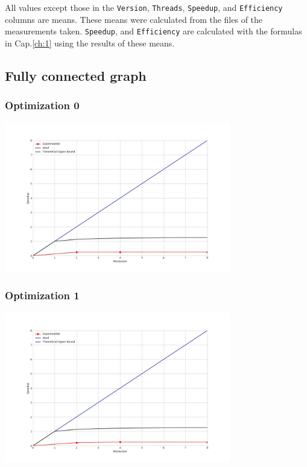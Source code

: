 All values except those in the \verb|Version|, \verb|Threads|, \verb|Speedup|, and \verb|Efficiency| columns are means. These means were calculated from the files of the measurements taken.
\verb|Speedup|, and \verb|Efficiency| are calculated with the formulas in Cap.\ref{ch:1} using the results of these means.

\clearpage
\subsection{Fully connected graph}
\subsubsection{Optimization 0}
\begin{center}
    \resizebox{0.8\textwidth}{!}{}
    \includegraphics[width=0.74\textwidth]{../img/speedup-graph_type-fully-connected-12500-O0}
\end{center}

\subsubsection{Optimization 1}
\begin{center}
    \resizebox{0.8\textwidth}{!}{}
    \includegraphics[width=0.74\textwidth]{../img/speedup-graph_type-fully-connected-12500-O1}
\end{center}


